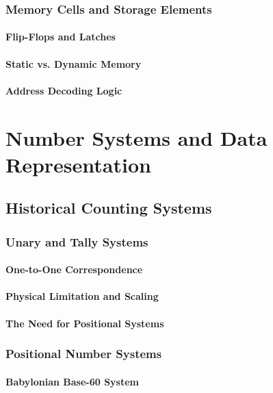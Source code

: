 \documentclass[12pt, oneside]{book}
\begin{document}
\subsection{Memory Cells and Storage Elements}
\subsubsection{Flip-Flops and Latches}
\subsubsection{Static vs. Dynamic Memory}
\subsubsection{Address Decoding Logic}


\chapter{Number Systems and Data Representation}

\section{Historical Counting Systems}
\subsection{Unary and Tally Systems}
\subsubsection{One-to-One Correspondence}
\subsubsection{Physical Limitation and Scaling}
\subsubsection{The Need for Positional Systems}

\subsection{Positional Number Systems}
\subsubsection{Babylonian Base-60 System}
\end{document}
